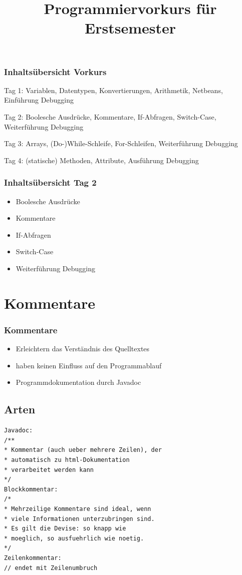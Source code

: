 \documentclass[final]{beamer}
\title{Programmiervorkurs für Erstsemester}
\begin{document}
\lstset{tabsize=2}
\lstset{basicstyle=\small}
\lstset{language=java}
\lstset{showstringspaces=false}
\begin{frame}
  \titlepage
\end{frame}

\begin{frame}
  \frametitle{Inhaltsübersicht Vorkurs}
  \begin{itemize}
  {\color{gray}
    \item {Tag 1: Variablen, Datentypen, Konvertierungen, Arithmetik, Netbeans, Einführung Debugging}
    {\color{black}
    \item {Tag 2: Boolesche Ausdrücke, Kommentare, If-Abfragen, Switch-Case, Weiterführung Debugging}
    }
    \item {Tag 3: Arrays, (Do-)While-Schleife, For-Schleifen, Weiterführung Debugging}
    \item {Tag 4: (statische) Methoden, Attribute, Ausführung Debugging}
  }
  \end{itemize}
\end{frame}

\begin{frame}
	\frametitle{Inhaltsübersicht Tag 2}
	\begin{itemize}
		\item {Boolesche Ausdrücke}
		\item {Kommentare}
		\item {If-Abfragen}
		\item {Switch-Case}
		\item {Weiterführung Debugging}
	\end{itemize}
\end{frame}

\section{Kommentare}
\begin{frame}
	\frametitle{Kommentare}
	\begin{itemize}
		\item{Erleichtern das Verständnis des Quelltextes}
		\item{haben keinen Einfluss auf den Programmablauf}
		\item{Programmdokumentation durch Javadoc}
	\end{itemize}
\end{frame}

\subsection{Arten}
\begin{frame}[containsverbatim]
	\begin{lstlisting}
Javadoc:
/**
* Kommentar (auch ueber mehrere Zeilen), der
* automatisch zu html-Dokumentation
* verarbeitet werden kann
*/
Blockkommentar:
/*
* Mehrzeilige Kommentare sind ideal, wenn
* viele Informationen unterzubringen sind.
* Es gilt die Devise: so knapp wie
* moeglich, so ausfuehrlich wie noetig.
*/
Zeilenkommentar:
// endet mit Zeilenumbruch
	\end{lstlisting}
\end{frame}
\end{document}
